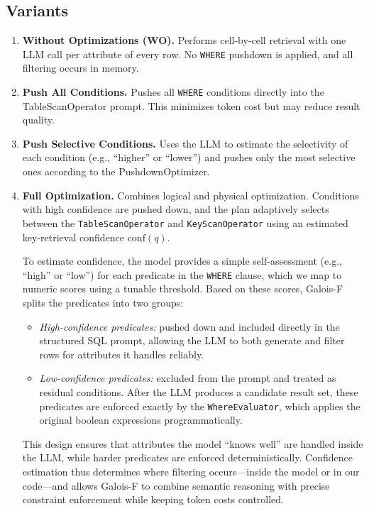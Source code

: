 \documentclass[12pt]{article}
\begin{document}
\subsection{Variants}
\begin{enumerate}
    \item \textbf{Without Optimizations (WO).}  
    Performs cell-by-cell retrieval with one LLM call per attribute of every row. No \texttt{WHERE} pushdown is applied, and all filtering occurs in memory.
    
    \item \textbf{Push All Conditions.}  
    Pushes all \texttt{WHERE} conditions directly into the TableScanOperator prompt. This minimizes token cost but may reduce result quality.

    \item \textbf{Push Selective Conditions.}  
    Uses the LLM to estimate the selectivity of each condition (e.g., ``higher'' or ``lower'') and pushes only the most selective ones according to the PushdownOptimizer.

    \item \textbf{Full Optimization.}
Combines logical and physical optimization. Conditions with high confidence are pushed down, and the plan adaptively selects between the \texttt{TableScanOperator} and \texttt{KeyScanOperator} using an estimated key-retrieval confidence $\text{conf}(q)$.

To estimate confidence, the model provides a simple self-assessment (e.g., ``high'' or ``low'') for each predicate in the \texttt{WHERE} clause, which we map to numeric scores using a tunable threshold. Based on these scores, Galois-F splits the predicates into two groups:

\begin{itemize}
    \item \textit{High-confidence predicates:} pushed down and included directly in the structured SQL prompt, allowing the LLM to both generate and filter rows for attributes it handles reliably.
    \item \textit{Low-confidence predicates:} excluded from the prompt and treated as residual conditions. After the LLM produces a candidate result set, these predicates are enforced exactly by the \texttt{WhereEvaluator}, which applies the original boolean expressions programmatically.
\end{itemize}

This design ensures that attributes the model ``knows well'' are handled inside the LLM, while harder predicates are enforced deterministically. Confidence estimation thus determines where filtering occurs—inside the model or in our code—and allows Galois-F to combine semantic reasoning with precise constraint enforcement while keeping token costs controlled.


\end{enumerate}
\end{document}
